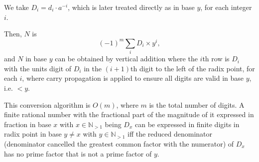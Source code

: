 \documentclass[a4paper,12pt]{article}
\begin{document}
We take $D_i=d_i\cdot a^{-i}$, which is later treated directly as in base $y$, for each integer $i$.

Then, $N$ is
\[(-1)^m\sum_iD_i\times y^i,\]
and $N$ in base $y$ can be obtained by vertical addition where the $i$th row is $D_i$ with the units digit of $D_i$ in the $(i+1)$th digit to the left of the radix point, for each $i$, where carry propagation is applied to ensure all digits are valid in base $y$, i.e. $<y$.

This conversion algorithm is $O(m)$, where $m$ is the total number of digits.
A finite rational number with the fractional part of the magnitude of it expressed in fraction in base $x$ with $x\in\mathbb{N}_{>1}$ being $D_x$ can be expressed in finite digits in radix point in base $y\neq x$ with $y\in\mathbb{N}_{>1}$ iff the reduced denominator (denominator cancelled the greatest common factor with the numerator) of $D_x$ has no prime factor that is not a prime factor of $y$.
\end{document}
